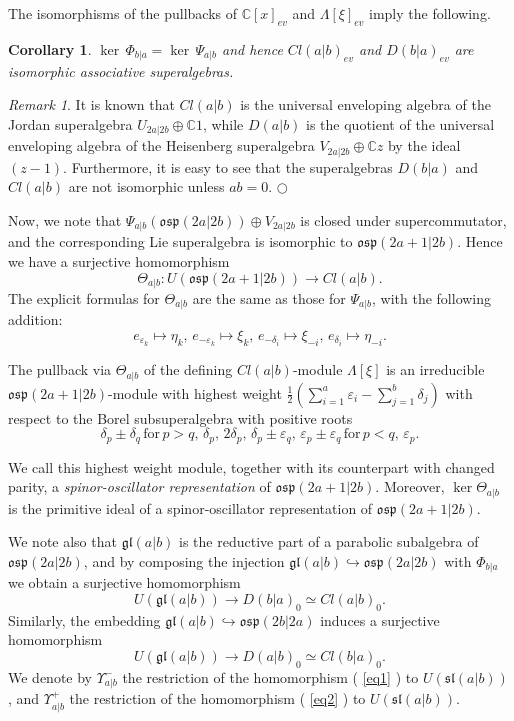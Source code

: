 \documentclass[12pt]{amsart}
\makeatletter
\def\@putname#1#2#3#4{\def\@@ref{#3}\let\old@bf\bf
        \def\bf##1{\old@bf\if?\noexpand##1?{#4}\else##1\fi}%
	#1{#2}%
        \let\bf\old@bf}
\def\@putname#1#2#3#4{\def\@@ref{#3}\let\old@bf\bf	%
	\let\old@reset@font\reset@font			%
        \def\bf##1{\old@bf\if?\noexpand##1?{#4}\else##1\fi}%
	\def\reset@font##1##2{\old@reset@font##1\if?\noexpand##2?{#4}\else##2\fi}#1{#2}%
        \let\bf\old@bf\let\reset@font\old@reset@font}
\let\my@ref=\ref
\def\ref#1{\@putname\my@ref{#1}{#1}{\tiny\rm\@@ref}}
\theoremstyle{plain} %
\numberwithin{equation}{section}
\theoremstyle{definition}
\theoremstyle{remark}
\newtheorem{remark}[definition]{Remark} %
\theoremstyle{plain} %
\newtheorem{corollary}[definition]{Corollary}
\newcommand{\osp}{\mathfrak{osp}}
\newcommand{\ggl}{\mathfrak{gl}}
\newcommand{\C}{\mathbb{C}}
\makeatother
\begin{document}
The isomorphisms of the pullbacks of $\C [x]_{ev}$ and  $\Lambda [\xi]_{ev}$ imply the following.
    \begin{corollary}\label{isomorphism_even} $\ker \, \Phi_{b|a}=\ker\, \Psi_{a|b}$ and hence $Cl(a|b)_{ev}$ and $D(b|a)_{ev}$ are isomorphic associative superalgebras.
    \end{corollary}
  
    \begin{remark} It is known that $Cl(a|b)$ is the universal enveloping algebra of the Jordan superalgebra $U_{2a|2b}\oplus\mathbb C 1$, while $D(a|b)$ is the quotient of the universal enveloping algebra of the Heisenberg
      superalgebra $V_{2a|2b}\oplus\mathbb C z$ by the ideal $(z-1)$.  Furthermore, it is easy to see that the superalgebras $D(b|a)$ and $Cl(a|b)$ are not isomorphic unless $ab=0$.
    \hfill${\bigcirc}$    \end{remark}

    Now, we note that $\Psi_{a|b}(\osp(2a|2b))\oplus V_{2a|2b}$ is closed under supercommutator, and the corresponding Lie superalgebra is isomorphic to $\osp(2a+1|2b)$. Hence we have a surjective homomorphism
    $$\Theta_{a|b}: U(\osp(2a+1|2b))\to Cl(a|b).$$
     The explicit formulas for  $\Theta_{a|b}$ are the same as those for $\Psi_{a|b}$, with the following addition:
    $$e_{\varepsilon_k} \mapsto \eta_{k}, \, e_{-\varepsilon_k }  \mapsto \xi_{k}, \, e_{-\delta_i } \mapsto \xi_{-i}, \, e_{\delta_{i}} \mapsto \eta_{-i}.$$


    The pullback via $\Theta_{a|b}$ of the defining $Cl(a|b)$-module  $\Lambda[\xi]$  is an irreducible $\osp(2a+1|2b)$-module with highest weight  $\frac{1}{2}\left( \sum_{i=1}^a \varepsilon_i - \sum_{j=1}^b \delta_j \right)$ with respect to the Borel subsuperalgebra with positive roots 
$$\delta_p\pm\delta_q\,\text{for}\,p>q,\,\delta_p,\,2\delta_{p},\,\delta_p\pm\varepsilon_q,\,\varepsilon_p\pm\varepsilon_q\,\text{for}\,p<q,\,\varepsilon_p.$$

  We call this highest weight module, together with its counterpart with changed parity, a \emph{spinor-oscillator representation} of $\osp(2a+1|2b)$. Moreover, $\ker\Theta_{a|b}$ is the primitive ideal of a spinor-oscillator representation of $\osp(2a+1|2b)$.
    
  


      We note also that $\ggl(a|b)$ is the reductive part of a parabolic subalgebra of $\osp(2a|2b)$, and by composing {the injection} $\ggl(a|b)\hookrightarrow \osp(2a|2b)$ with $\Phi_{b|a}$ we  obtain a surjective homomorphism
      \begin{equation}\label{eq1} U(\ggl(a|b))\to D(b|a)_0\simeq Cl(a|b)_{0}.
        \end{equation}
        Similarly, the embedding $\ggl(a|b)\hookrightarrow\osp(2b|2a)$ induces a surjective homomorphism
\begin{equation}\label{eq2}
  U(\ggl(a|b))\to D(a|b)_0\simeq Cl(b|a)_{0}.
\end{equation}
We denote by $\Upsilon^-_{a|b}$ the restriction of the homomorphism (\ref{eq1}) to $U(\mathfrak{sl}(a|b))$, and  $\Upsilon^+_{a|b}$ the
restriction of the homomorphism (\ref{eq2}) to $U(\mathfrak{sl}(a|b))$.
      
\end{document}
